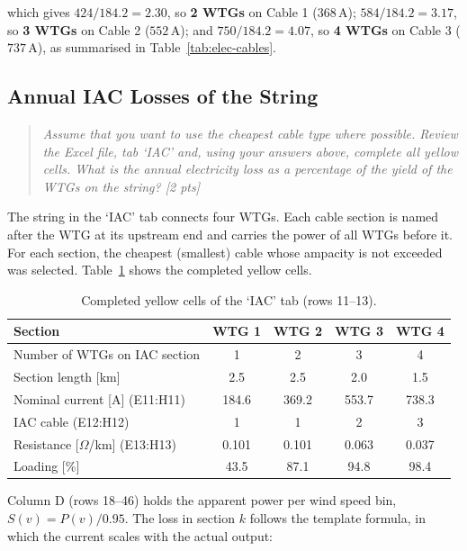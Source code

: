 which gives $424/184.2 = 2.30$, so \textbf{2 WTGs} on Cable 1 ($368\,\mathrm{A}$); $584/184.2 = 3.17$, so \textbf{3 WTGs} on Cable 2 ($552\,\mathrm{A}$); and $750/184.2 = 4.07$, so \textbf{4 WTGs} on Cable 3 ($737\,\mathrm{A}$), as summarised in Table~\ref{tab:elec-cables}.

\subsection{Annual IAC Losses of the String}
\label{sec:elec-iac-losses}
\begin{quote}
\emph{Assume that you want to use the cheapest cable type where possible. Review the Excel file, tab `IAC' and, using your answers above, complete all yellow cells. What is the annual electricity loss as a percentage of the yield of the WTGs on the string? [2 pts]}
\end{quote}

The string in the `IAC' tab connects four WTGs. Each cable section is named after the WTG at its upstream end and carries the power of all WTGs before it. For each section, the cheapest (smallest) cable whose ampacity is not exceeded was selected. Table~\ref{tab:elec-yellow} shows the completed yellow cells.

\begin{table}[H]
    \centering
    \caption{Completed yellow cells of the `IAC' tab (rows 11--13).}
    \label{tab:elec-yellow}
    \begin{tabular}{lcccc}
        \hline
        Section & WTG 1 & WTG 2 & WTG 3 & WTG 4 \\
        \hline
        Number of WTGs on IAC section & 1 & 2 & 3 & 4 \\
        Section length [km] & 2.5 & 2.5 & 2.0 & 1.5 \\
        Nominal current [A] (E11:H11) & 184.6 & 369.2 & 553.7 & 738.3 \\
        IAC cable (E12:H12) & 1 & 1 & 2 & 3 \\
        Resistance [$\Omega$/km] (E13:H13) & 0.101 & 0.101 & 0.063 & 0.037 \\
        Loading [\%] & 43.5 & 87.1 & 94.8 & 98.4 \\
        \hline
    \end{tabular}
\end{table}

Column D (rows 18--46) holds the apparent power per wind speed bin, $S(v) = P(v)/0.95$. The loss in section $k$ follows the template formula, in which the current scales with the actual output:

